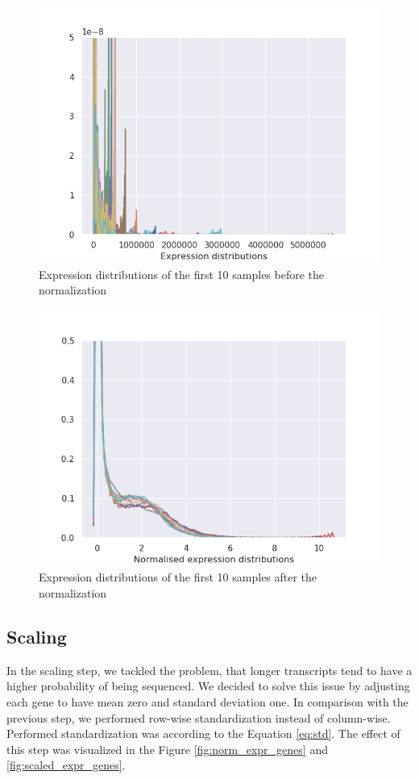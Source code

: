 \begin{figure}
    \centering
    \includegraphics[width=0.8\linewidth]{images/expr_dist.png}
    \caption{Expression distributions of the first 10 samples before the normalization}
    \label{fig:expr_dist}
\end{figure}

\begin{figure}
    \centering
    \includegraphics[width=0.8\linewidth]{images/norm_expr_dist.png}
    \caption{Expression distributions of the first 10 samples after the normalization}
    \label{fig:norm_expr_dist}
\end{figure}

\subsection{Scaling}
In the scaling step, we tackled the problem, that longer transcripts tend to have a higher probability of being sequenced.
We decided to solve this issue by adjusting each gene to have mean zero and standard deviation one.
In comparison with the previous step, we performed row-wise standardization instead of column-wise.
Performed standardization was according to the Equation \ref{eq:std}.
The effect of this step was visualized in the Figure \ref{fig:norm_expr_genes} and \ref{fig:scaled_expr_genes}.

